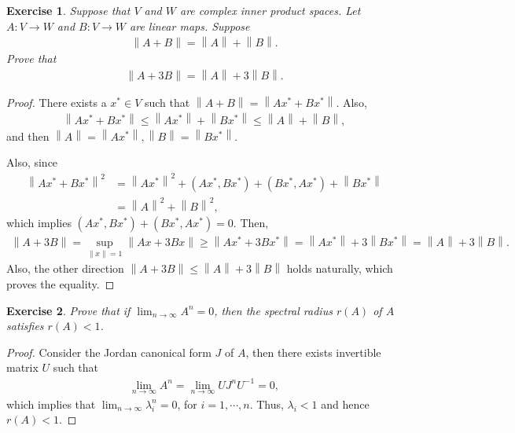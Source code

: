 \documentclass[10pt]{book}
\newtheorem{exercise}{Exercise}[section]
\theoremstyle{definition}
\numberwithin{equation}{chapter}
\begin{document}
\medskip

\begin{exercise}
Suppose that $V$ and $W$ are complex inner product spaces. Let $A: V \to W$ and $B:V \to W$ are linear maps. Suppose 
\begin{align*}
    \left\|A + B\right\| = \left\|A\right\| + \left\|B\right\|.
\end{align*}
Prove that
\begin{align*}
    \left\|A + 3B\right\| = \left\|A\right\| + 3\left\|B\right\|.
\end{align*}
\end{exercise}
\begin{proof}
There exists a $x^* \in V$ such that $\left\|A + B\right\| = \left\|Ax^* + Bx^*\right\|$. Also,
\begin{align*}
    \left\|Ax^* + Bx^*\right\| \leq \left\|Ax^*\right\| + \left\|Bx^*\right\| \leq \left\|A\right\| + \left\|B\right\|,
\end{align*}
and then $\left\|A\right\| = \left\|Ax^*\right\|, \left\|B\right\| = \left\|Bx^*\right\|$. 

Also, since
\begin{align*}
    \left\|Ax^* + Bx^*\right\|^2 & = \left\|Ax^*\right\|^2 + (Ax^*,Bx^*) + (Bx^*,Ax^*) + \left\|Bx^*\right\| \\
    & = \left\|A\right\|^2 + \left\|B\right\|^2,
\end{align*}
which implies $(Ax^*, Bx^*) + (Bx^*, Ax^*) = 0$. Then,
\begin{align*}
    \left\|A + 3B\right\| = \sup_{\|x\| = 1} \left\|Ax + 3Bx\right\| \geq \left\|Ax^* + 3Bx^*\right\| = \left\|Ax^*\right\| + 3\left\|Bx^*\right\| = \left\|A\right\| + 3 \left\|B\right\|.
\end{align*}
Also, the other direction $\left\|A + 3B\right\| \leq \left\|A\right\| + 3 \left\|B\right\|$ holds naturally, which proves the equality.
\end{proof}

\medskip

\begin{exercise}
Prove that if $\lim_{n\to\infty} A^n = 0$, then the spectral radius $r(A)$ of $A$ satisfies $r(A) < 1$.
\end{exercise}
\begin{proof}
Consider the Jordan canonical form $J$ of $A$, then there exists invertible matrix $U$ such that 
\begin{align*}
    \lim_{n \to \infty} A^n = \lim_{n \to \infty} U J^n U^{-1} = 0,
\end{align*}
which implies that $\lim_{n \to \infty} \lambda_i^n = 0$, for $i = 1, \cdots, n$. Thus, $\lambda_i < 1$ and hence $r(A) < 1$.
\end{proof}
\end{document}
